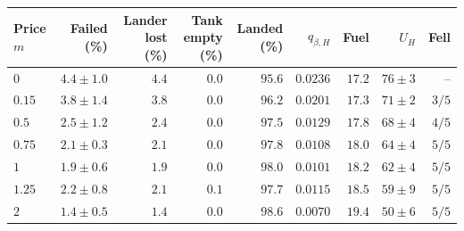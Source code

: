 \begin{tabular}{lrrrrrrrr}
\toprule
Price $m$ & Failed (\%) & Lander lost (\%) & Tank empty (\%) & Landed (\%) & $q_{\beta,H}$ & Fuel & $U_H$ & Fell \\
\midrule
$0$ & $4.4\pm1.0$ & $4.4$ & $0.0$ & $95.6$ & $0.0236$ & $17.2$ & $76\pm3$ & -- \\
$0.15$ & $3.8\pm1.4$ & $3.8$ & $0.0$ & $96.2$ & $0.0201$ & $17.3$ & $71\pm2$ & $3/5$ \\
$0.5$ & $2.5\pm1.2$ & $2.4$ & $0.0$ & $97.5$ & $0.0129$ & $17.8$ & $68\pm4$ & $4/5$ \\
$0.75$ & $2.1\pm0.3$ & $2.1$ & $0.0$ & $97.8$ & $0.0108$ & $18.0$ & $64\pm4$ & $5/5$ \\
$1$ & $1.9\pm0.6$ & $1.9$ & $0.0$ & $98.0$ & $0.0101$ & $18.2$ & $62\pm4$ & $5/5$ \\
$1.25$ & $2.2\pm0.8$ & $2.1$ & $0.1$ & $97.7$ & $0.0115$ & $18.5$ & $59\pm9$ & $5/5$ \\
$2$ & $1.4\pm0.5$ & $1.4$ & $0.0$ & $98.6$ & $0.0070$ & $19.4$ & $50\pm6$ & $5/5$ \\
\bottomrule
\end{tabular}
